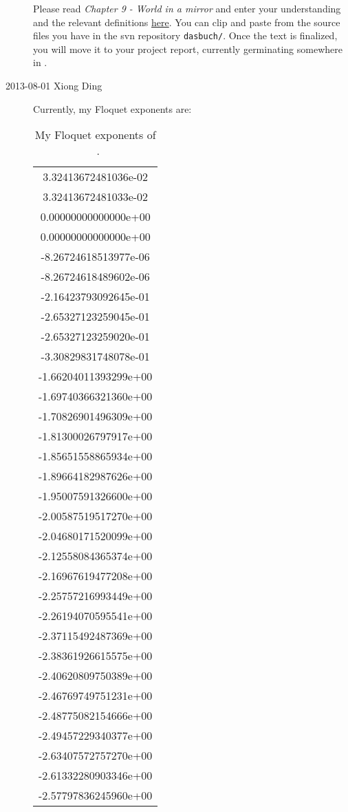 \begin{description}
Please read
{\em Chapter 9 - World in a mirror} and enter your understanding and the
relevant definitions \underline{here}. You can clip and paste from
the source files you have in the svn repository \texttt{dasbuch/}. Once the text is
finalized, you will move it to your project report, currently germinating
somewhere in .

\item[2013-08-01 Xiong Ding]
Currently, my Floquet exponents are:

\begin{table}[H]
\caption{My Floquet exponents of \po\ .}
\label{xiong_fe1025}
\begin{center}
\begin{tabular}{c}

   3.32413672481036e-02\\
   3.32413672481033e-02\\
   0.00000000000000e+00\\
   0.00000000000000e+00\\
  -8.26724618513977e-06\\
  -8.26724618489602e-06\\
  -2.16423793092645e-01\\
  -2.65327123259045e-01\\
  -2.65327123259020e-01\\
  -3.30829831748078e-01\\
  -1.66204011393299e+00\\
  -1.69740366321360e+00\\
  -1.70826901496309e+00\\
  -1.81300026797917e+00\\
  -1.85651558865934e+00\\
  -1.89664182987626e+00\\
  -1.95007591326600e+00\\
  -2.00587519517270e+00\\
  -2.04680171520099e+00\\
  -2.12558084365374e+00\\
  -2.16967619477208e+00\\
  -2.25757216993449e+00\\
  -2.26194070595541e+00\\
  -2.37115492487369e+00\\
  -2.38361926615575e+00\\
  -2.40620809750389e+00\\
  -2.46769749751231e+00\\
  -2.48775082154666e+00\\
  -2.49457229340377e+00\\
  -2.63407572757270e+00\\
  -2.61332280903346e+00\\
  -2.57797836245960e+00\\
\end{tabular}
\end{center}
\end{table}


\end{description}
